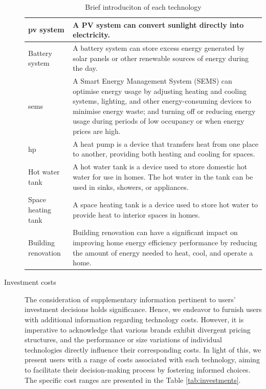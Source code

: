 \begin{description}
\begin{center}
\begin{table}[h!]
\begin{tabular}{ | p{} | p{} | }
            \hline
            \gls{pv} system & A PV system can convert sunlight directly into electricity. \\
            \hline
            Battery system & A battery system can store excess energy generated by solar panels or other renewable sources of energy during the day. \\
            \hline
            \gls{sems} & A Smart Energy Management System (SEMS) can optimise energy usage by adjusting heating and cooling systems, lighting, and other energy-consuming devices to minimise energy waste; and turning off or reducing energy usage during periods of low occupancy or when energy prices are high. \\
            \hline
            \gls{hp} &  A heat pump is a device that transfers heat from one place to another, providing both heating and cooling for spaces. \\
            \hline
            Hot water tank & A hot water tank is a device used to store domestic hot water for use in homes. The hot water in the tank can be used in sinks, showers, or appliances. \\
            \hline
            Space heating tank & A space heating tank is a device used to store hot water to provide heat to interior spaces in homes. \\
            \hline
            Building renovation & Building renovation can have a significant impact on improving home energy efficiency performance by reducing the amount of energy needed to heat, cool, and operate a home. \\
            \hline
          \end{tabular}
      \caption{Brief introduciton of each technology}
      \label{tab:introduction}
      \end{table}
    \end{center}
  \item[Investment costs] The consideration of supplementary information pertinent to users' investment decisions holds significance. 
    Hence, we endeavor to furnish users with additional information regarding technology costs. 
    However, it is imperative to acknowledge that various brands exhibit divergent pricing structures, and the performance or size variations of individual technologies directly influence their corresponding costs. 
    In light of this, we present users with a range of costs associated with each technology, aiming to facilitate their decision-making process by fostering informed choices. 
    The specific cost ranges are presented in the Table \ref{tab:investments}.

\end{description}
